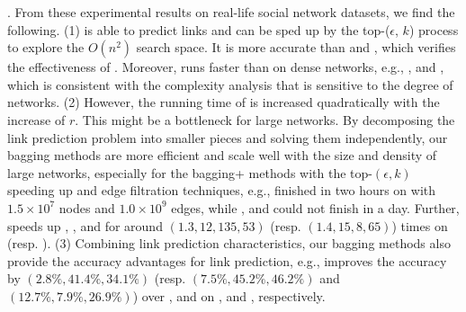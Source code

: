 . From these experimental results on real-life social network datasets,
we find the following. (1) \NMF is able to predict links and can be sped up
by the top-($\epsilon$, $k$) process to explore the $O(n^2)$ search space. It is
more accurate than \Aa and \BIGCLAM, which verifies the effectiveness
of \NMF. Moreover, \NMF runs faster than \BIGCLAM on dense networks,
e.g., \Wikipedia, \Twitter and \Friendster, which is consistent with the complexity analysis
that \BIGCLAM is sensitive to the degree of networks. (2) However, the running time of
\NMF is increased quadratically with the increase of $r$. This might be a bottleneck
for large networks. By decomposing the link prediction problem into smaller pieces
and solving them independently, our bagging methods are more efficient and
scale well with the size and density of large networks, especially for the bagging+
methods with the top-$(\epsilon, k)$ speeding up and edge filtration techniques,
e.g., \Biasedp finished in two hours on \Friendster with $1.5\times 10^7$ nodes and
$1.0\times 10^9$ edges, while \NMF, \Aa  and \BIGCLAM could not finish in a day.
Further, \Biasedp speeds up \Biased, \NMF, \Aa and \BIGCLAM
for around $(1.3, 12, 135, 53)$ (resp. $(1.4, 15, 8, 65)$) times on \Twitter (resp. \Friendster).
(3) Combining link prediction characteristics, our
bagging methods also provide the accuracy advantages for link prediction,
e.g., \Biased improves the accuracy by
$(2.8\%, 41.4\%, 34.1\%)$ (resp. $(7.5\%, 45.2\%, 46.2\%)$ and $(12.7\%, 7.9\%, 26.9\%)$)
over \NMF, \Aa and \BIGCLAM on \Digg, \YouTube and \Wikipedia, respectively.













%
%
%
%
%
%


